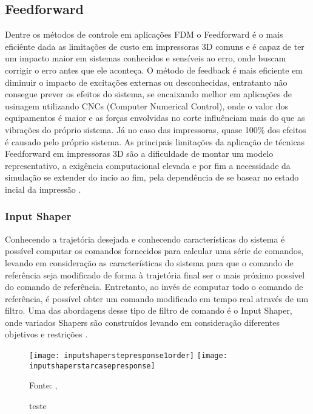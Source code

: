 \subsection{Feedforward}
Dentre os métodos de controle em aplicações FDM o Feedforward 
é o mais eficiênte dada as limitações de custo em impressoras 
3D comuns e é capaz de ter um impacto maior em sistemas 
conhecidos e sensíveis ao erro, onde buscam corrigir o erro 
antes que ele aconteça. O método de feedback é mais eficiente em
diminuir o impacto de excitações externas ou desconhecidas,
entratanto não consegue prever os efeitos do sistema, se encaixando
melhor em aplicações de usinagem utilizando CNCs (Computer Numerical Control),
onde o valor dos equipamentos é maior e as forças envolvidas no corte
influênciam mais do que as vibrações do próprio sistema.
Já no caso das impressoras, quase 100\% dos efeitos é causado pelo próprio
sistema. As principais limitações da aplicação de técnicas Feedforward
em impressoras 3D são a dificuldade de montar um modelo representativo,
a exigência computacional elevada e por fim a necessidade da simulação
se extender do incio ao fim, pela dependência de se basear no estado 
incial da impressão \cite{ramani20,duan18}.

\subsubsection{Input Shaper}
Conhecendo a trajetória desejada e conhecendo características 
do sistema é possível computar os comandos fornecidos para 
calcular uma série de comandos, levando em consideração as 
características do sistema para que o comando de referência 
seja modificado de forma à trajetória final ser o mais próximo 
possível do comando de referência. Entretanto, ao invés de 
computar todo o comando de referência, é possível obter um 
comando modificado em tempo real através de um filtro. 
Uma das abordagens desse tipo de filtro de comando é o 
Input Shaper, onde variados Shapers são construídos levando 
em consideração diferentes objetivos e restrições 
\cite{singhose97}.

\begin{figure}[!htb]
    \centering
    \caption{teste}
    \texttt{[image: inputshaperstepresponse1order]}
    \texttt{[image: inputshaperstarcasepresponse]}

    {\footnotesize Fonte: \citeauthor{singhose97}, \citeyear{singhose97}}
    \label{fig:label4}
\end{figure}

